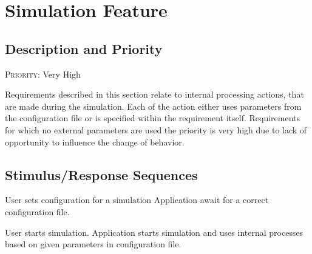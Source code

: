 \section{Simulation Feature} \label{s:system-features:simulation-feature}
	\begin{comment}
		$<$Don’t really say “System Feature 1.” State the feature name in just a few 
		words.$>$
	\end{comment}

\subsection*{Description and Priority}
	\begin{comment}
		$<$Provide a short description of the feature and indicate whether it is of 
		High, Medium, or Low priority. You could also include specific priority 
		component ratings, such as benefit, penalty, cost, and risk (each rated on a 
		relative scale from a low of 1 to a high of 9).$>$
	\end{comment}
	
	\textsc{Priority: } Very High
	
	Requirements described in this section relate to internal processing actions, that are made during the simulation. Each of the action either uses parameters from the configuration file or is specified within the requirement itself. Requirements for which no external parameters are used the priority is very high due to lack of opportunity to influence the change of behavior.
\subsection*{Stimulus/Response Sequences}
	\begin{comment}
		$<$List the sequences of user actions and system responses that stimulate the 
		behavior defined for this feature. These will correspond to the dialog elements 
		associated with use cases.$>$
	\end{comment}
	
	\stimresp
	{User sets configuration for a simulation}
	{Application await for a correct configuration file.}

	\medskip
	
	\stimresp
	{User starts simulation.}
	{Application starts simulation and uses internal processes based on given parameters in configuration file.}
